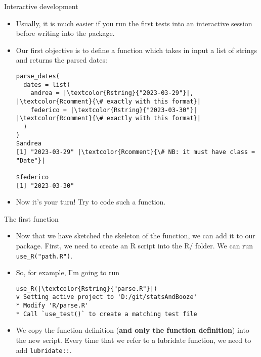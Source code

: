 \documentclass[
hyperref={bookmarks=false},
xcolor={dvipsnames,svgnames*,x11names*}, 
12pt
]{beamer}
\begin{document}
\begin{frame}[fragile]{Interactive development}
\vspace{-0.5cm}
\begin{itemize}
\itemsep 2ex
\item Usually, it is much easier if you run the first tests into an interactive session before writing into the package. 
\item Our first objective is to define a function which takes in input a list of strings and returns the parsed dates:
\begin{lstlisting}
parse_dates(
  dates = list(
    andrea = |\textcolor{Rstring}{"2023-03-29"}|, |\textcolor{Rcomment}{\# exactly with this format}|
    federico = |\textcolor{Rstring}{"2023-03-30"}| |\textcolor{Rcomment}{\# exactly with this format}|
  )
)
$andrea
[1] "2023-03-29" |\textcolor{Rcomment}{\# NB: it must have class = "Date"}|

$federico
[1] "2023-03-30"
\end{lstlisting}
\item Now it's your turn! Try to code such a function. 
\end{itemize}
\end{frame}

\begin{frame}[fragile]{The first function}
\vspace{-0.5cm}
\begin{itemize}
\itemsep 2ex
\item Now that we have sketched the skeleton of the function, we can add it to our package. First, we need to create an R script into the R/ folder. We can run \texttt{use\_R(\textcolor{Rstring}{"path.R"})}. 
\item So, for example, I'm going to run 
\begin{lstlisting}
use_R(|\textcolor{Rstring}{"parse.R"}|)
v Setting active project to 'D:/git/statsAndBooze'
* Modify 'R/parse.R'
* Call `use_test()` to create a matching test file
\end{lstlisting}
\item We copy the function definition (\textbf{and only the function definition}) into the new script. Every time that we refer to a lubridate function, we need to add \texttt{lubridate::}. 
\end{itemize}
\end{frame}
\end{document}
